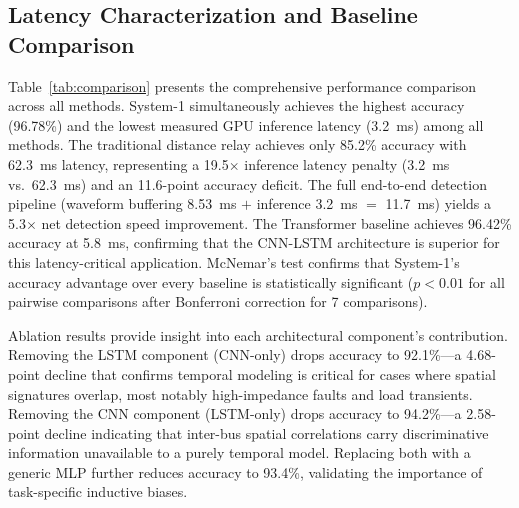\documentclass[journal]{IEEEtran}
\begin{document}
\subsection{Latency Characterization and Baseline Comparison}

Table~\ref{tab:comparison} presents the comprehensive performance comparison across all methods. System-1 simultaneously achieves the highest accuracy (96.78\%) and the lowest measured GPU inference latency (3.2~ms) among all methods. The traditional distance relay achieves only 85.2\% accuracy with 62.3~ms latency, representing a 19.5$\times$ inference latency penalty (3.2~ms vs.\ 62.3~ms) and an 11.6-point accuracy deficit. The full end-to-end detection pipeline (waveform buffering 8.53~ms $+$ inference 3.2~ms $=$ 11.7~ms) yields a 5.3$\times$ net detection speed improvement. The Transformer baseline achieves 96.42\% accuracy at 5.8~ms, confirming that the CNN-LSTM architecture is superior for this latency-critical application. McNemar's test confirms that System-1's accuracy advantage over every baseline is statistically significant ($p < 0.01$ for all pairwise comparisons after Bonferroni correction for 7 comparisons).

Ablation results provide insight into each architectural component's contribution. Removing the LSTM component (CNN-only) drops accuracy to 92.1\%---a 4.68-point decline that confirms temporal modeling is critical for cases where spatial signatures overlap, most notably high-impedance faults and load transients. Removing the CNN component (LSTM-only) drops accuracy to 94.2\%---a 2.58-point decline indicating that inter-bus spatial correlations carry discriminative information unavailable to a purely temporal model. Replacing both with a generic MLP further reduces accuracy to 93.4\%, validating the importance of task-specific inductive biases.
\end{document}
